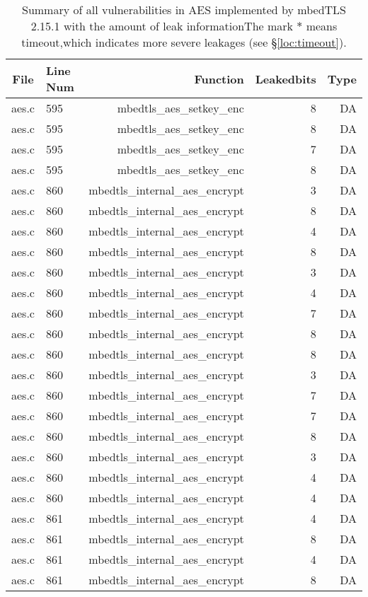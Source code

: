 \begin{table*}%
\centering
\caption{Summary of all vulnerabilities in AES implemented by mbedTLS 2.15.1 with the amount of leak informationThe mark $*$ means timeout,which indicates more severe leakages (see \S\ref{loc:timeout}).}\label{tab:AESmbedTLS}
\begin{tabular}{clrrr}
\hline
\textbf{File} & \textbf{Line Num} & \textbf{Function} & \textbf{Leakedbits} & \textbf{Type} \\\hline
aes.c&595&mbedtls\_aes\_setkey\_enc&8 &DA\\
aes.c&595&mbedtls\_aes\_setkey\_enc&8 &DA\\
aes.c&595&mbedtls\_aes\_setkey\_enc&7 &DA\\
aes.c&595&mbedtls\_aes\_setkey\_enc&8 &DA\\
aes.c&860&mbedtls\_internal\_aes\_encrypt&3 &DA\\
aes.c&860&mbedtls\_internal\_aes\_encrypt&8 &DA\\
aes.c&860&mbedtls\_internal\_aes\_encrypt&4 &DA\\
aes.c&860&mbedtls\_internal\_aes\_encrypt&8 &DA\\
aes.c&860&mbedtls\_internal\_aes\_encrypt&3 &DA\\
aes.c&860&mbedtls\_internal\_aes\_encrypt&4 &DA\\
aes.c&860&mbedtls\_internal\_aes\_encrypt&7 &DA\\
aes.c&860&mbedtls\_internal\_aes\_encrypt&8 &DA\\
aes.c&860&mbedtls\_internal\_aes\_encrypt&8 &DA\\
aes.c&860&mbedtls\_internal\_aes\_encrypt&3 &DA\\
aes.c&860&mbedtls\_internal\_aes\_encrypt&7 &DA\\
aes.c&860&mbedtls\_internal\_aes\_encrypt&7 &DA\\
aes.c&860&mbedtls\_internal\_aes\_encrypt&8 &DA\\
aes.c&860&mbedtls\_internal\_aes\_encrypt&3 &DA\\
aes.c&860&mbedtls\_internal\_aes\_encrypt&4 &DA\\
aes.c&860&mbedtls\_internal\_aes\_encrypt&4 &DA\\
aes.c&861&mbedtls\_internal\_aes\_encrypt&4 &DA\\
aes.c&861&mbedtls\_internal\_aes\_encrypt&8 &DA\\
aes.c&861&mbedtls\_internal\_aes\_encrypt&4 &DA\\
aes.c&861&mbedtls\_internal\_aes\_encrypt&8 &DA\\

\end{tabular}
\end{table*}
